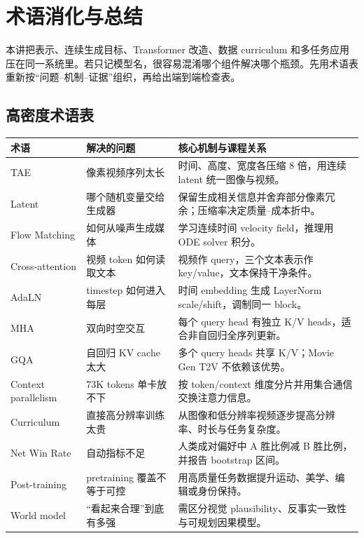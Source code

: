 \section{术语消化与总结}

本讲把表示、连续生成目标、Transformer 改造、数据 curriculum 和多任务应用压在同一系统里。若只记模型名，很容易混淆哪个组件解决哪个瓶颈。先用术语表重新按“问题--机制--证据”组织，再给出端到端检查表。

\subsection{高密度术语表}

\begin{center}
\small
\begin{tabularx}{\textwidth}{p{} X X}
\toprule
\textbf{术语} & \textbf{解决的问题} & \textbf{核心机制与课程关系} \\
\midrule
TAE & 像素视频序列太长 & 时间、高度、宽度各压缩 8 倍，用连续 latent 统一图像与视频。 \\
Latent & 哪个随机变量交给生成器 & 保留生成相关信息并舍弃部分像素冗余；压缩率决定质量--成本折中。 \\
Flow Matching & 如何从噪声生成媒体 & 学习连续时间 velocity field，推理用 ODE solver 积分。 \\
Cross-attention & 视频 token 如何读取文本 & 视频作 query，三个文本表示作 key/value，文本保持干净条件。 \\
AdaLN & timestep 如何进入每层 & 时间 embedding 生成 LayerNorm scale/shift，调制同一 block。 \\
MHA & 双向时空交互 & 每个 query head 有独立 K/V heads，适合非自回归全序列更新。 \\
GQA & 自回归 KV cache 太大 & 多个 query heads 共享 K/V；Movie Gen T2V 不依赖该优势。 \\
Context parallelism & 73K tokens 单卡放不下 & 按 token/context 维度分片并用集合通信交换注意力信息。 \\
Curriculum & 直接高分辨率训练太贵 & 从图像和低分辨率视频逐步提高分辨率、时长与任务复杂度。 \\
Net Win Rate & 自动指标不足 & 人类成对偏好中 A 胜比例减 B 胜比例，并报告 bootstrap 区间。 \\
Post-training & pretraining 覆盖不等于可控 & 用高质量任务数据提升运动、美学、编辑或身份保持。 \\
World model & “看起来合理”到底有多强 & 需区分视觉 plausibility、反事实一致性与可规划因果模型。 \\
\bottomrule
\end{tabularx}
\end{center}

